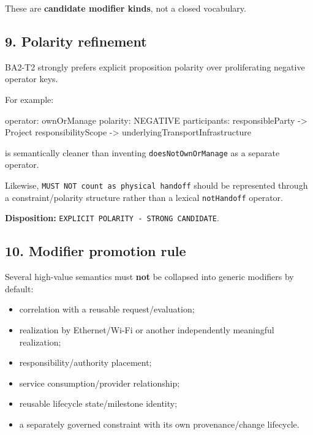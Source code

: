 \documentclass[
  10pt,
  letterpaper,
]{article}
\newenvironment{Shaded}{}{}
\newcommand{\NormalTok}[1]{#1}
\providecommand{\tightlist}{%
  \setlength{\itemsep}{0pt}\setlength{\parskip}{0pt}}
\begin{document}
These are \textbf{candidate modifier kinds}, not a closed vocabulary.

\subsection{9. Polarity refinement}\label{polarity-refinement}

BA2-T2 strongly prefers explicit proposition polarity over proliferating
negative operator keys.

For example:

\begin{Shaded}
\begin{Highlighting}[]
\NormalTok{operator: ownOrManage}
\NormalTok{polarity: NEGATIVE}
\NormalTok{participants:}
\NormalTok{  responsibleParty {-}\textgreater{} Project}
\NormalTok{  responsibilityScope {-}\textgreater{} underlyingTransportInfrastructure}
\end{Highlighting}
\end{Shaded}

is semantically cleaner than inventing \texttt{doesNotOwnOrManage} as a
separate operator.

Likewise, \texttt{MUST\ NOT\ count\ as\ physical\ handoff} should be
represented through a constraint/polarity structure rather than a
lexical \texttt{notHandoff} operator.

\textbf{Disposition:} \texttt{EXPLICIT\ POLARITY\ -\ STRONG\ CANDIDATE}.

\subsection{10. Modifier promotion rule}\label{modifier-promotion-rule}

Several high-value semantics must \textbf{not} be collapsed into generic
modifiers by default:

\begin{itemize}
\tightlist
\item
  correlation with a reusable request/evaluation;
\item
  realization by Ethernet/Wi-Fi or another independently meaningful
  realization;
\item
  responsibility/authority placement;
\item
  service consumption/provider relationship;
\item
  reusable lifecycle state/milestone identity;
\item
  a separately governed constraint with its own provenance/change
  lifecycle.
\end{itemize}
\end{document}
